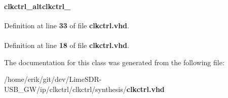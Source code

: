 \paragraph[{altclkctrl\+\_\+0}]{ {\bfseries \textcolor{vhdlchar}{clkctrl\+\_\+altclkctrl\+\_}\textcolor{vhdlchar}{ }} \hspace{0.3cm}{\ttfamily [Instantiation]}}\label{classclkctrl_1_1rtl_a456c3790ed142a7d6c38477d204310a0}


Definition at line {\bf 33} of file {\bf clkctrl.\+vhd}.

\paragraph[{clkctrl\+\_\+altclkctrl\+\_\+0}]{ {\bfseries \textcolor{vhdlchar}{ }} \hspace{0.3cm}{\ttfamily [Component]}}\label{classclkctrl_1_1rtl_a49782f39c172b40993f89b76d3c62eef}


Definition at line {\bf 18} of file {\bf clkctrl.\+vhd}.



The documentation for this class was generated from the following file\+:\begin{DoxyCompactItemize}
\item 
/home/erik/git/dev/\+Lime\+S\+D\+R-\/\+U\+S\+B\+\_\+\+G\+W/ip/clkctrl/clkctrl/synthesis/{\bf clkctrl.\+vhd}\end{DoxyCompactItemize}
